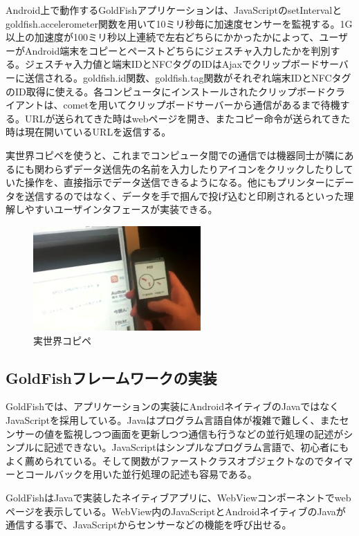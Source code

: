 Android上で動作するGoldFishアプリケーションは、JavaScriptのsetIntervalとgoldfish.accelerometer関数を用いて10ミリ秒毎に加速度センサーを監視する。1G以上の加速度が100ミリ秒以上連続で左右どちらにかかったかによって、ユーザーがAndroid端末をコピーとペーストどちらにジェスチャ入力したかを判別する。ジェスチャ入力値と端末IDとNFCタグのIDはAjaxでクリップボードサーバーに送信される。goldfish.id関数、goldfish.tag関数がそれぞれ端末IDとNFCタグのID取得に使える。各コンピュータにインストールされたクリップボードクライアントは、cometを用いてクリップボードサーバーから通信があるまで待機する。URLが送られてきた時はwebページを開き、またコピー命令が送られてきた時は現在開いているURLを返信する。

実世界コピペを使うと、これまでコンピュータ間での通信では機器同士が隣にあるにも関わらずデータ送信先の名前を入力したりアイコンをクリックしたりしていた操作を、直接指示でデータ送信できるようになる。他にもプリンターにデータを送信するのではなく、データを手で掴んで投げ込むと印刷されるといった理解しやすいユーザインタフェースが実装できる。

\begin{figure}
  \begin{center}
    \includegraphics[height=40mm]{img/copy-paste.jpg}
  \end{center}
  \caption{実世界コピペ}
  \label{fig:copy-paste}
\end{figure}


\subsection{GoldFishフレームワークの実装}
GoldFishでは、アプリケーションの実装にAndroidネイティブのJavaではなくJavaScriptを採用している。Javaはプログラム言語自体が複雑で難しく、またセンサーの値を監視しつつ画面を更新しつつ通信も行うなどの並行処理の記述がシンプルに記述できない。JavaScriptはシンプルなプログラム言語で、初心者にもよく薦められている。そして関数がファーストクラスオブジェクトなのでタイマーとコールバックを用いた並行処理の記述も容易である。

GoldFishはJavaで実装したネイティブアプリに、WebViewコンポーネントでwebページを表示している。WebView内のJavaScriptとAndroidネイティブのJavaが通信する事で、JavaScriptからセンサーなどの機能を呼び出せる。

